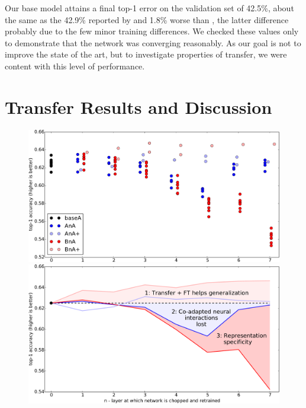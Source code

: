 
Our base model attains a final top-1 error on the validation set of 42.5\%, about the same as the 42.9\% reported by \cite{donahue+jia-2013-arxiv} and 1.8\% worse than \cite{Krizhevsky-2012}, the latter difference probably due to the few minor training differences. We checked these values only to demonstrate that the network was converging reasonably. As our goal is not to improve the state of the art, but to investigate properties of transfer, we were content with this level of performance.






\section{Transfer Results and Discussion}
\label{sec:experiments}


\begin{figure}[htpb]
\begin{center}
\includegraphics[width=1\linewidth]{plots/result_transfer_crop.pdf}
\includegraphics[width=1\linewidth]{plots/result_transfer_lines_crop.pdf}
\end{center}
\caption{}
\label{fig:results}
\end{figure}

